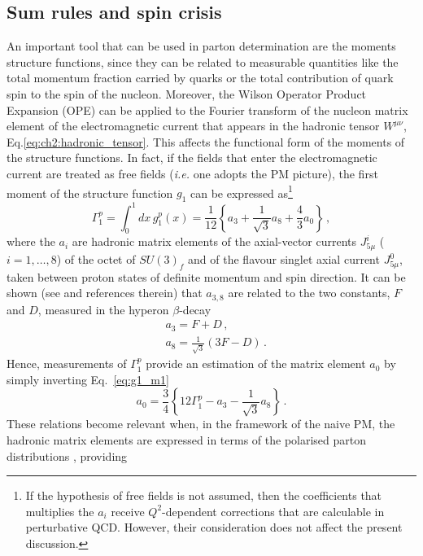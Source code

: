 \subsection*{Sum rules and spin crisis}
An important tool that can be used in parton determination are the moments structure functions, since they can be related to measurable quantities like the total momentum fraction carried by quarks or the total contribution of quark spin to the spin of the nucleon. Moreover, the Wilson Operator Product Expansion (OPE) can be applied to the Fourier transform of the nucleon matrix element of the electromagnetic current that appears in the hadronic tensor $W^{\mu \nu}$, Eq.\eqref{eq:ch2:hadronic_tensor}. This affects the functional form of the moments of the structure functions. In fact, if the fields that enter the electromagnetic current are treated as free fields (\textit{i.e.} one adopts the PM picture), the first moment of the structure function $g_1$ can be expressed as\footnote{If the hypothesis of free fields is not assumed, then the coefficients that multiplies the $a_i$ receive $Q^2$-dependent corrections that are calculable in perturbative QCD. However, their consideration does not affect the present discussion.}
\begin{equation}
  \Gamma_{1}^{p} = \int_{0}^{1} dx \, g_{1}^{p}(x) = \frac{1}{12} \left\{ a_3 + \frac{1}{\sqrt{3}} a_8 + \frac{4}{3} a_{0} \right\}\,,
  \label{eq:g1_m1}
\end{equation}
where the $a_i$ are hadronic matrix elements of the axial-vector currents $J^{i}_{5 \mu}$ ($i=1,\dots,8$) of the octet of $SU(3)_{f}$ and of the flavour singlet axial current $J^{0}_{5 \mu}$, taken between proton states of definite momentum and spin direction. It can be shown (see \cite{Anselmino:1993tc} and references therein) that $a_{3,8}$ are related to the two constants, $F$ and $D$, measured in the hyperon $\beta$-decay
\begin{align}
  & a_3 = F + D \,, \\
  & a_8 = \frac{1}{\sqrt{3}} (3F - D)\,.
\end{align}
Hence, measurements of $\Gamma_{1}^{p}$ provide an estimation of the matrix element $a_0$ by simply inverting Eq.~\eqref{eq:g1_m1}
\begin{equation}
  a_0 =  \frac{3}{4} \left\{ 12 \Gamma_{1}^p - a_3 - \frac{1}{\sqrt{3}} a_8 \right\}\,.
\end{equation}
These relations become relevant when, in the framework of the naive PM, the hadronic matrix elements are expressed in terms of the polarised parton distributions \cite{Anselmino:1993tc}, providing
